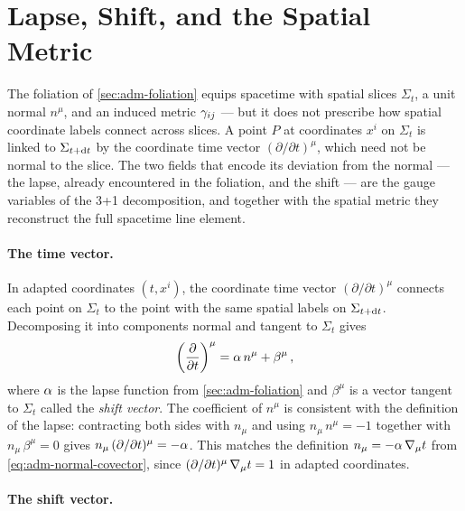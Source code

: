 \section{Lapse, Shift, and the Spatial Metric}
\label{sec:adm-lapse-shift}

The foliation of \cref{sec:adm-foliation} equips spacetime with spatial
slices $\Sigma_t$, a unit normal $n^\mu$, and an induced metric
$\gamma_{ij}$ --- but it does not prescribe how spatial coordinate
labels connect across slices.  A point $P$ at coordinates $x^i$ on
$\Sigma_t$ is linked to $\Sigma_{t+\mathrm{d} t}$ by the coordinate time
vector $(\partial/\partial t)^\mu$, which need not be normal to the
slice.  The two fields that encode its deviation from the normal ---
the lapse, already encountered in the foliation, and the shift --- are
the gauge variables of the 3+1 decomposition, and together with the
spatial metric they reconstruct the full spacetime line element.

\paragraph{The time vector.}

In adapted coordinates $(t, x^i)$, the coordinate time vector
$(\partial/\partial t)^\mu$ connects each point on $\Sigma_t$ to the
point with the same spatial labels on $\Sigma_{t+\mathrm{d} t}$.  Decomposing
it into components normal and tangent to $\Sigma_t$ gives
%
\begin{equation}
  \left(\frac{\partial}{\partial t}\right)^\mu
  = \alpha\,n^\mu + \beta^\mu \,,
  \label{eq:adm-time-vector}
\end{equation}
%
where $\alpha$ is the lapse function from \cref{sec:adm-foliation} and
$\beta^\mu$ is a vector tangent to $\Sigma_t$ called the \emph{shift
vector}.  The coefficient of $n^\mu$ is consistent with the definition
of the lapse: contracting both sides with $n_\mu$ and using
$n_\mu\,n^\mu = -1$ together with $n_\mu\,\beta^\mu = 0$ gives
$n_\mu\,(\partial/\partial t)^\mu = -\alpha$.  This matches the
definition $n_\mu = -\alpha\,\nabla_{\mu}t$ from
\cref{eq:adm-normal-covector}, since
$(\partial/\partial t)^\mu\,\nabla_{\mu}t = 1$ in adapted coordinates.

\paragraph{The shift vector.}

